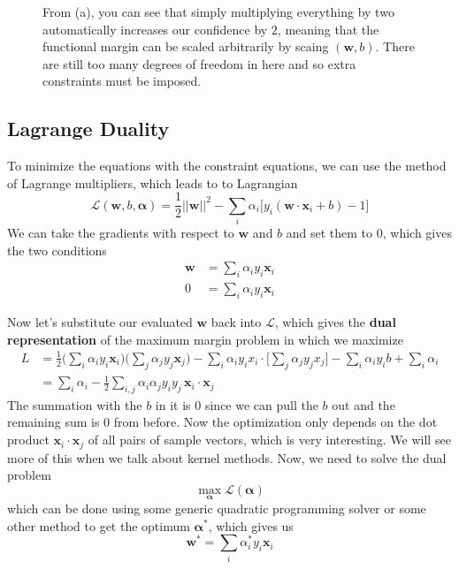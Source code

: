 \documentclass{article}
\theoremstyle{definition}
\begin{document}
\begin{figure}[hbt!]
      \caption{From (a), you can see that simply multiplying everything by two automatically increases our confidence by $2$, meaning that the functional margin can be scaled arbitrarily by scaing $(\mathbf{w}, b)$. There are still too many degrees of freedom in here and so extra constraints must be imposed. } 
      \label{fig:scaling_problem} 
  \end{figure}


  \subsection{Lagrange Duality} 

  To minimize the equations with the constraint equations, we can use the method of Lagrange multipliers, which leads to to Lagrangian 
  \[\mathcal{L}(\mathbf{w}, b, \boldsymbol{\alpha}) = \frac{1}{2} ||\mathbf{w}||^2 - \sum_i \alpha_i \big[ y_i (\mathbf{w} \cdot \mathbf{x}_i + b) - 1\big]\]
  We can take the gradients with respect to $\mathbf{w}$ and $b$ and set them to $0$, which gives the two conditions 
  \begin{align*} 
    \mathbf{w} & = \sum_i \alpha_i y_i \mathbf{x}_i \\
    0 & = \sum_i \alpha_i y_i \mathbf{x}_i 
  \end{align*}

  Now let's substitute our evaluated $\mathbf{w}$ back into $\mathcal{L}$, which gives the \textbf{dual representation} of the maximum margin problem in which we maximize  
  \begin{align*} 
      L & = \frac{1}{2} \bigg( \sum_i \alpha_i y_i \mathbf{x}_i \bigg) \bigg( \sum_j \alpha_j y_j \mathbf{x}_j \bigg) - \sum_{i} \alpha_i y_i x_i \cdot \bigg[ \sum_j \alpha_j y_j x_j \bigg] - \sum_i \alpha_i y_i b + \sum_i \alpha_i \\ 
        & = \sum_i \alpha_i - \frac{1}{2} \sum_{i, j} \alpha_i \alpha_j y_i y_j \, \mathbf{x}_i \cdot \mathbf{x}_j 
  \end{align*}
  The summation with the $b$ in it is $0$ since we can pull the $b$ out and the remaining sum is $0$ from before. Now the optimization only depends on the dot product $\mathbf{x}_i \cdot \mathbf{x}_j$ of all pairs of sample vectors, which is very interesting. We will see more of this when we talk about kernel methods. Now, we need to solve the dual problem 
  \[\max_{\boldsymbol{\alpha}} \mathcal{L}(\boldsymbol{\alpha})\]
  which can be done using some generic quadratic programming solver or some other method to get the optimum $\boldsymbol{\alpha}^\ast$, which gives us 
  \[\mathbf{w}^\ast = \sum_i \alpha_i^\ast y_i \mathbf{x}_i\]
\end{document}
